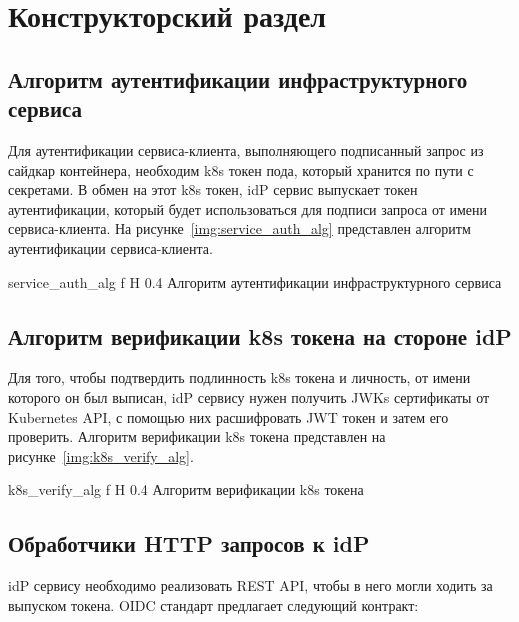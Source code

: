 \chapter{Конструкторский раздел}

\section{Алгоритм аутентификации инфраструктурного сервиса}
Для аутентификации сервиса-клиента, выполняющего подписанный запрос из сайдкар контейнера, необходим k8s токен пода, который хранится по пути с секретами. В обмен на этот k8s токен, idP сервис выпускает токен аутентификации, который будет использоваться для подписи запроса от имени сервиса-клиента. На рисунке~\ref{img:service_auth_alg} представлен алгоритм аутентификации сервиса-клиента.

    {service_auth_alg}
    {f}
    {H}
    {0.4\textwidth}
    {Алгоритм аутентификации инфраструктурного сервиса}

\pagebreak

\section{Алгоритм верификации k8s токена на стороне idP}
Для того, чтобы подтвердить подлинность k8s токена и личность, от имени которого он был выписан, idP сервису нужен получить JWKs сертификаты от Kubernetes API, с помощью них расшифровать JWT токен и затем его проверить. Алгоритм верификации k8s токена представлен на рисунке~\ref{img:k8s_verify_alg}.

    {k8s_verify_alg}
    {f}
    {H}
    {0.4\textwidth}
    {Алгоритм верификации k8s токена}


\pagebreak

\section{Обработчики HTTP запросов к idP}

idP сервису необходимо реализовать REST API, чтобы в него могли ходить за выпуском токена.
OIDC стандарт предлагает следующий контракт:

